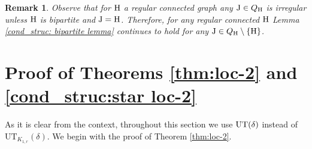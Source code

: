 \documentclass[a4paper,11pt,english,reqno]{amsart}
\numberwithin{equation}{section}
\newcommand{\UT}{\textup{UT}(\delta)}
\newcommand{\uH}{\textup{H}}
\newcommand{\tu}[1]{\textup{#1}}
\newtheorem{remark}[theorem]{Remark}
\begin{document}
			\begin{remark}\label{rmk:J-copy-bound}
				Observe that for $\tu{H}$ a regular connected graph any $\tu{J} \in {Q}_{\tu{H}}$ is irregular unless $\tu{H}$ is bipartite and $\tu{J}=\tu{H}$. Therefore, for any regular connected $\tu{H}$ Lemma \ref{cond_struc: bipartite lemma} continues to hold for any $\tu{J} \in Q_{\uH}\setminus \{\tu{H}\}$.
			\end{remark}
			
			\section{Proof of Theorems 
				\ref{thm:loc-2} and \ref{cond_struc:star loc-2}}
			As it is clear from the context, throughout this section we use $\UT$ instead of $\text{UT}_{K_{1,r}}(\delta)$. We begin with the proof of Theorem \ref{thm:loc-2}.
\end{document}
